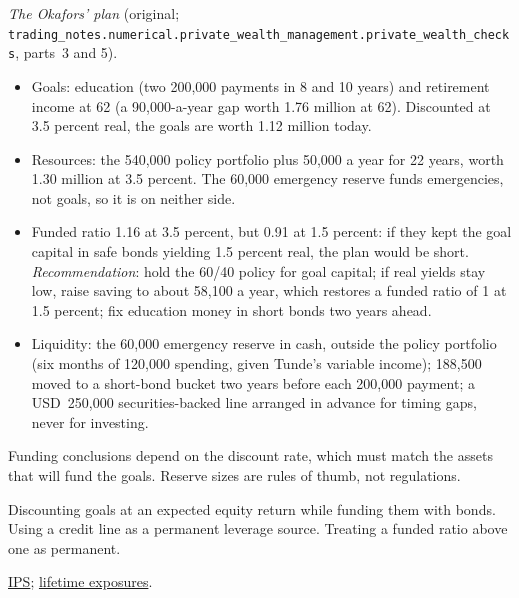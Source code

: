 \begin{qfmethod}
 \emph{The Okafors' plan} (original; \nolinkurl{trading_notes.numerical.private_wealth_management.private_wealth_checks}, parts~3 and 5).
\begin{itemize}
\item Goals: education (two 200,000 payments in 8 and 10 years) and retirement income at 62 (a 90,000-a-year gap worth 1.76 million at 62). Discounted at 3.5 percent real, the goals are worth 1.12 million today.
\item Resources: the 540,000 policy portfolio plus 50,000 a year for 22 years, worth 1.30 million at 3.5 percent. The 60,000 emergency reserve funds emergencies, not goals, so it is on neither side.
\item Funded ratio 1.16 at 3.5 percent, but 0.91 at 1.5 percent: if they kept the goal capital in safe bonds yielding 1.5 percent real, the plan would be short. \emph{Recommendation}: hold the 60/40 policy for goal capital; if real yields stay low, raise saving to about 58,100 a year, which restores a funded ratio of 1 at 1.5 percent; fix education money in short bonds two years ahead.
\item Liquidity: the 60,000 emergency reserve in cash, outside the policy portfolio (six months of 120,000 spending, given Tunde's variable income); 188,500 moved to a short-bond bucket two years before each 200,000 payment; a USD~250,000 securities-backed line arranged in advance for timing gaps, never for investing.
\end{itemize}

 Funding conclusions depend on the discount rate, which must match the assets that will fund the goals. Reserve sizes are rules of thumb, not regulations.

 Discounting goals at an expected equity return while funding them with bonds. Using a credit line as a permanent leverage source. Treating a funded ratio above one as permanent.

 \hyperref[meth:private-client-ips]{IPS}; \hyperref[meth:lifetime-exposures]{lifetime exposures}.

\end{qfmethod}

